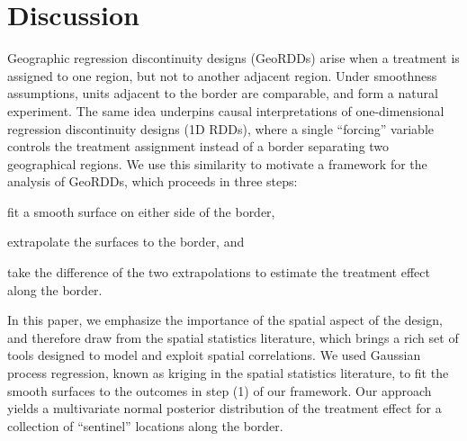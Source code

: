 \section{Discussion}

Geographic regression discontinuity designs (GeoRDDs) arise when a treatment is assigned to one region, but not to another adjacent region.
Under smoothness assumptions, units adjacent to the border are comparable, and form a natural experiment.
The same idea underpins causal interpretations of one-dimensional regression discontinuity designs (1D RDDs), where a single ``forcing'' variable controls the treatment assignment instead of a border separating two geographical regions.
We use this similarity to motivate a framework for the analysis of GeoRDDs, which proceeds in three steps:
\begin{flatlist} 
\item fit a smooth surface on either side of the border,
\item extrapolate the surfaces to the border, and 
\item take the difference of the two extrapolations to estimate the treatment effect along the border.
\end{flatlist}

In this paper, we emphasize the importance of the spatial aspect of the design, and therefore draw from the spatial statistics literature, which brings a rich set of tools designed to model and exploit spatial correlations.
We used Gaussian process regression, known as kriging in the spatial statistics literature, to fit the smooth surfaces to the outcomes in step (1) of our framework.
Our approach yields a multivariate normal posterior distribution of the treatment effect for a collection of ``sentinel'' locations along the border.

